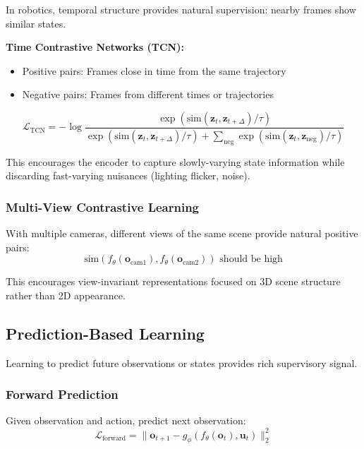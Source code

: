 In robotics, temporal structure provides natural supervision: nearby frames show similar states.

\textbf{Time Contrastive Networks (TCN):}
\begin{itemize}
    \item Positive pairs: Frames close in time from the same trajectory
    \item Negative pairs: Frames from different times or trajectories
\end{itemize}

\begin{equation}
\mathcal{L}_{\text{TCN}} = -\log \frac{\exp(\text{sim}(\mathbf{z}_t, \mathbf{z}_{t+\Delta}) / \tau)}{\exp(\text{sim}(\mathbf{z}_t, \mathbf{z}_{t+\Delta}) / \tau) + \sum_{\text{neg}} \exp(\text{sim}(\mathbf{z}_t, \mathbf{z}_{\text{neg}}) / \tau)}
\label{eq:tcn_loss}
\end{equation}

This encourages the encoder to capture slowly-varying state information while discarding fast-varying nuisances (lighting flicker, noise).

\subsubsection{Multi-View Contrastive Learning}

With multiple cameras, different views of the same scene provide natural positive pairs:
\begin{equation}
\text{sim}(f_\theta(\mathbf{o}_{\text{cam1}}), f_\theta(\mathbf{o}_{\text{cam2}})) \text{ should be high}
\label{eq:multiview_contrastive}
\end{equation}

This encourages view-invariant representations focused on 3D scene structure rather than 2D appearance.

\subsection{Prediction-Based Learning}

Learning to predict future observations or states provides rich supervisory signal.

\subsubsection{Forward Prediction}

Given observation and action, predict next observation:
\begin{equation}
\mathcal{L}_{\text{forward}} = \| \mathbf{o}_{t+1} - g_\phi(f_\theta(\mathbf{o}_t), \mathbf{u}_t) \|_2^2
\label{eq:forward_prediction}
\end{equation}

